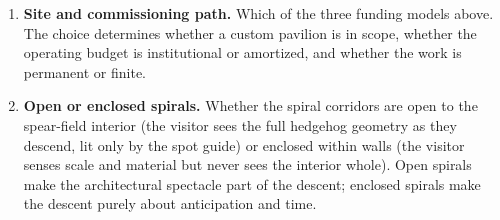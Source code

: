 \documentclass[]{anvil-installation}
\begin{document}
\begin{enumerate}
  \item \textbf{Site and commissioning path.} Which of the three funding models above. The choice determines whether a custom pavilion is in scope, whether the operating budget is institutional or amortized, and whether the work is permanent or finite.
  \item \textbf{Open or enclosed spirals.} Whether the spiral corridors are open to the spear-field interior (the visitor sees the full hedgehog geometry as they descend, lit only by the spot guide) or enclosed within walls (the visitor senses scale and material but never sees the interior whole). Open spirals make the architectural spectacle part of the descent; enclosed spirals make the descent purely about anticipation and time.
\end{enumerate}

\end{document}
